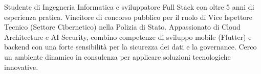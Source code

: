 
\begin{cvparagraph}
    Studente di Ingegneria Informatica e sviluppatore Full Stack con oltre 5 anni di esperienza pratica. Vincitore di concorso pubblico per il ruolo di Vice Ispettore Tecnico (Settore Cibernetico) nella Polizia di Stato. Appassionato di Cloud Architecture e AI Security, combino competenze di sviluppo mobile (Flutter) e backend con una forte sensibilità per la sicurezza dei dati e la governance. Cerco un ambiente dinamico in consulenza per applicare soluzioni tecnologiche innovative.
\end{cvparagraph}
